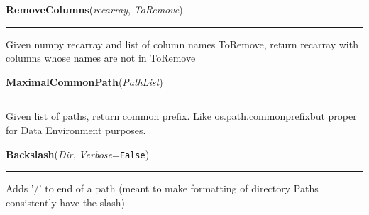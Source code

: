     \label{System:Utils:RemoveColumns}

    \vspace{0.5ex}

\hspace{.8\funcindent}\begin{boxedminipage}{\funcwidth}

    \raggedright \textbf{RemoveColumns}(\textit{recarray}, \textit{ToRemove})

    \vspace{-1.5ex}

    \rule{\textwidth}{0.5\fboxrule}
\setlength{\parskip}{2ex}
    Given numpy recarray and list of column names ToRemove, return recarray
    with columns whose names are not in ToRemove

\setlength{\parskip}{1ex}
    \end{boxedminipage}

    \label{System:Utils:MaximalCommonPath}

    \vspace{0.5ex}

\hspace{.8\funcindent}\begin{boxedminipage}{\funcwidth}

    \raggedright \textbf{MaximalCommonPath}(\textit{PathList})

    \vspace{-1.5ex}

    \rule{\textwidth}{0.5\fboxrule}
\setlength{\parskip}{2ex}
    Given list of paths, return common prefix.  Like 
    os.path.commonprefixbut proper for Data Environment purposes.

\setlength{\parskip}{1ex}
    \end{boxedminipage}

    \label{System:Utils:Backslash}

    \vspace{0.5ex}

\hspace{.8\funcindent}\begin{boxedminipage}{\funcwidth}

    \raggedright \textbf{Backslash}(\textit{Dir}, \textit{Verbose}={\tt False})

    \vspace{-1.5ex}

    \rule{\textwidth}{0.5\fboxrule}
\setlength{\parskip}{2ex}
    Adds '/' to end of a path (meant to make formatting of directory Paths 
    consistently have the slash)

\setlength{\parskip}{1ex}
    \end{boxedminipage}

